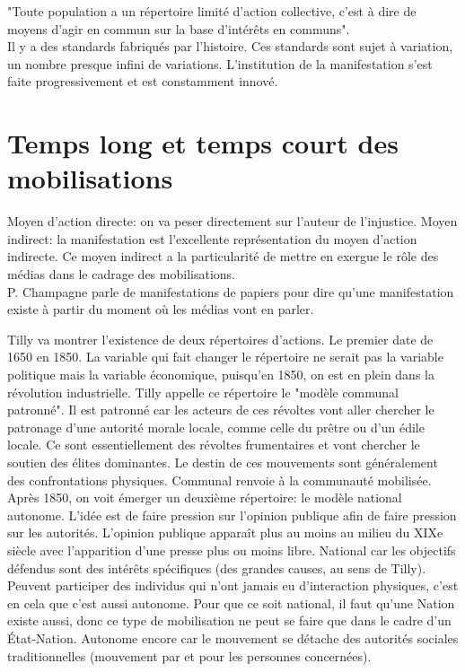 \documentclass[10pt, a4paper, openany]{book}
\begin{document}
"Toute population a un répertoire limité d'action collective, c'est à dire de moyens d'agir en commun sur la base d'intérêts en communs". \\
Il y a des standards fabriqués par l'histoire. Ces standards sont sujet à variation, un nombre presque infini de variations. L'institution de la manifestation s'est faite progressivement et est constamment innové. 

\section{Temps long et temps court des mobilisations}

Moyen d'action directe: on va peser directement sur l'auteur de l'injustice. Moyen indirect: la manifestation est l'excellente représentation du moyen d'action indirecte. Ce moyen indirect a la particularité de mettre en exergue le rôle des médias dans le cadrage des mobilisations. \\
P. Champagne parle de manifestations de papiers pour dire qu'une manifestation existe à partir du moment où les médias vont en parler.


Tilly va montrer l'existence de deux répertoires d'actions. Le premier date de 1650 en 1850. La variable qui fait changer le répertoire ne serait pas la variable politique mais la variable économique, puisqu'en 1850, on est en plein dans la révolution industrielle. Tilly appelle ce répertoire le "modèle communal patronné". Il est patronné car les acteurs de ces révoltes vont aller chercher le patronage d'une autorité morale locale, comme celle du prêtre ou d'un édile locale. Ce sont essentiellement des révoltes frumentaires et vont chercher le soutien des élites dominantes. Le destin de ces mouvements sont généralement des confrontations physiques. Communal renvoie à la communauté mobilisée. \\
Après 1850, on voit émerger un deuxième répertoire: le modèle national autonome. L'idée est de faire pression sur l'opinion publique afin de faire pression sur les autorités. L'opinion publique apparaît plus au moins au milieu du XIXe siècle avec l'apparition d'une presse plus ou moins libre. National car les objectifs défendus sont des intérêts spécifiques (des grandes causes, au sens de Tilly). Peuvent participer des individus qui n'ont jamais eu d'interaction physiques, c'est en cela que c'est aussi autonome. Pour que ce soit national, il faut qu'une Nation existe aussi, donc ce type de mobilisation ne peut se faire que dans le cadre d'un État-Nation. Autonome encore car le mouvement se détache des autorités sociales traditionnelles (mouvement par et pour les personnes concernées). 
\end{document}
